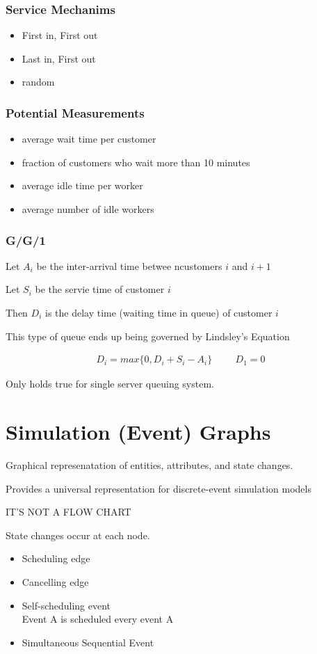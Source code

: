 \documentclass[fleqn]{report}
\newcommand{\hp}{\hspace{1cm}}
\newcommand{\equations} [1] {
\begin{gather*}
#1
\end{gather*}
}
\begin{document}
\subsection{Service Mechanims}
\begin{itemize}
    \item
    First in, First out 
    \item 
    Last in, First out 
    \item 
    random 
\end{itemize}

\subsection{Potential Measurements}
\begin{itemize}
    \item 
    average wait time per customer 
    \item 
    fraction of customers who wait more than 10 minutes 
    \item 
    average idle time per worker 
    \item 
    average number of idle workers 
\end{itemize}

\subsection{G/G/1}
Let $A_i$ be the inter-arrival time betwee ncustomers $i$ and $i+1$ 

Let $S_i$ be the servie time of customer $i$

Then $D_i$ is the delay time (waiting time in queue) of customer $i$

This type of queue ends up being governed by Lindsley's Equation 
\equations{
    D_i = max \{0, D_i + S_i - A_i\} 
    \hp 
    D_1 = 0
}
Only holds true for single server queuing system. 

\chapter{Simulation (Event) Graphs}
Graphical represenatation of entities, attributes, and state changes. 

Provides a universal representation for discrete-event simulation models 

IT'S NOT A FLOW CHART 

State changes occur at each node. 

\begin{itemize}
    \item 
    Scheduling edge 
    \item 
    Cancelling edge 
    \item 
    Self-scheduling event 
    \\
    Event A is scheduled every event A 
    \item 
    Simultaneous Sequential Event 
\end{itemize}
\end{document}

